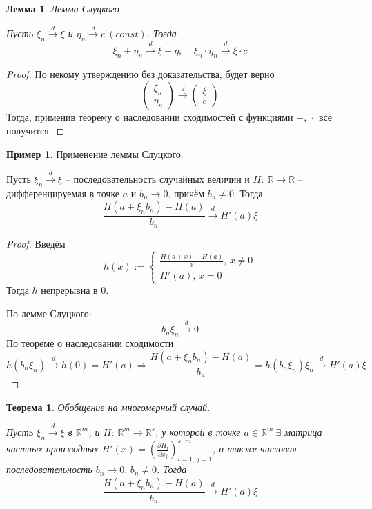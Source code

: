 \documentclass[a4paper,12pt]{article}
\theoremstyle{plain}
\newtheorem{theorem}{Теорема}[section]
\newtheorem{lemma}{Лемма}[section]
\theoremstyle{definition}
\newtheorem*{example}{Пример}
\theoremstyle{remark}
\begin{document}
\begin{lemma}
  Лемма Слуцкого.

  Пусть $\xi_n \overset{d}{\to} \xi$ и $\eta_n \overset{d}{\to} c \:(const)$. Тогда 
  \[
    \xi_n + \eta_n \overset{d}{\to} \xi + \eta ;\;\;\;\; \xi_n\cdot\eta_n \overset{d}{\to} \xi\cdot c
  \]
\end{lemma}

\begin{proof}
  По некому утверждению без доказательства, будет верно
  \[
    \begin{pmatrix}
      \xi_n\\
      \eta_n
    \end{pmatrix} \overset{d}{\to} \begin{pmatrix}
      \xi\\
      c
    \end{pmatrix}
  \]
  Тогда, применив теорему о наследовании сходимостей с функциями $+,\, \cdot$ всё получится.
\end{proof}

\begin{example}
  Применение леммы Слуцкого.

  Пусть $\xi_n \overset{d}{\to} \xi$ -- последовательность случайных величин и $H :\: \mathbb{R} \to \mathbb{R}$ -- дифференцируемая в точке $a$ и $b_n \to 0$, причём $b_n \neq 0$. Тогда
  \[
    \frac{H(a + \xi_nb_n) - H(a)}{b_n} \overset{d}{\to} H'(a)\xi
  \]
\end{example}

\begin{proof}
  Введём
  \[
    h(x) := \begin{cases}
      \frac{H(a + x) - H(a)}{x},\, x \neq 0\\
      H'(a),\, x = 0
    \end{cases}
  \]
  Тогда $h$ непрерывна в $0$.

  По лемме Слуцкого:
  \[
    b_n\xi_n \overset{d}{\to} 0
  \]
  По теореме о наследовании сходимости
  \[
    h(b_n\xi_n) \overset{d}{\to} h(0) = H'(a) \Rightarrow \frac{H(a + \xi_nb_n) - H(a)}{b_n} = h(b_n\xi_n)\xi_n \overset{d}{\to} H'(a)\xi
  \]
\end{proof}

\begin{theorem}
  Обобщение на многомерный случай.

  Пусть $\xi_n \overset{d}{\to} \xi$ в $\mathbb{R}^m$, и $H :\: \mathbb{R}^m \to \mathbb{R}^s$, у которой в точке $a \in \mathbb{R}^m \: \exists$ матрица частных производных $H'(x) = \left(\frac{\partial H_i}{\partial x_j}\right)_{i = 1,\,j = 1}^{s,\, m}$, а также числовая последовательность
  $b_n \to 0,\, b_n \neq 0$. Тогда
  \[
    \frac{H(a + \xi_nb_n) - H(a)}{b_n} \overset{d}{\to} H'(a)\xi
  \]
\end{theorem}
\end{document}
